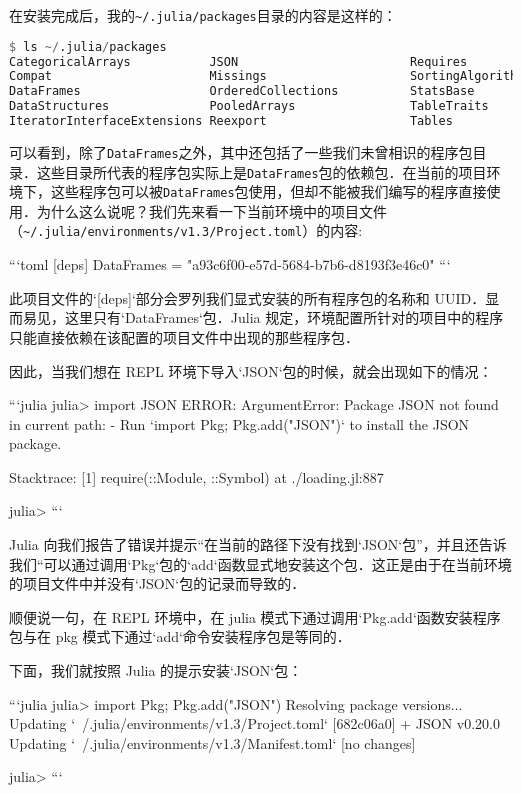 在安装完成后，我的\verb|~/.julia/packages|目录的内容是这样的：

\begin{lstlisting}[language=julia]
$ ls ~/.julia/packages
CategoricalArrays           JSON                        Requires
Compat                      Missings                    SortingAlgorithms
DataFrames                  OrderedCollections          StatsBase
DataStructures              PooledArrays                TableTraits
IteratorInterfaceExtensions Reexport                    Tables
\end{lstlisting}

可以看到，除了\verb|DataFrames|之外，其中还包括了一些我们未曾相识的程序包目录．这些目录所代表的程序包实际上是\verb|DataFrames|包的依赖包．在当前的项目环境下，这些程序包可以被\verb|DataFrames|包使用，但却不能被我们编写的程序直接使用．为什么这么说呢？我们先来看一下当前环境中的项目文件（\verb|~/.julia/environments/v1.3/Project.toml|）的内容:

```toml
[deps]
DataFrames = "a93c6f00-e57d-5684-b7b6-d8193f3e46c0"
```

此项目文件的`[deps]`部分会罗列我们显式安装的所有程序包的名称和 UUID．显而易见，这里只有`DataFrames`包．Julia 规定，环境配置所针对的项目中的程序只能直接依赖在该配置的项目文件中出现的那些程序包．

因此，当我们想在 REPL 环境下导入`JSON`包的时候，就会出现如下的情况：

```julia
julia> import JSON
ERROR: ArgumentError: Package JSON not found in current path:
- Run `import Pkg; Pkg.add("JSON")` to install the JSON package.

Stacktrace:
 [1] require(::Module, ::Symbol) at ./loading.jl:887

julia> 
```

Julia 向我们报告了错误并提示“在当前的路径下没有找到`JSON`包”，并且还告诉我们“可以通过调用`Pkg`包的`add`函数显式地安装这个包．这正是由于在当前环境的项目文件中并没有`JSON`包的记录而导致的．

顺便说一句，在 REPL 环境中，在 julia 模式下通过调用`Pkg.add`函数安装程序包与在 pkg 模式下通过`add`命令安装程序包是等同的．

下面，我们就按照 Julia 的提示安装`JSON`包：

```julia
julia> import Pkg; Pkg.add("JSON")
 Resolving package versions...
  Updating `~/.julia/environments/v1.3/Project.toml`
  [682c06a0] + JSON v0.20.0
  Updating `~/.julia/environments/v1.3/Manifest.toml`
 [no changes]

julia> 
```

